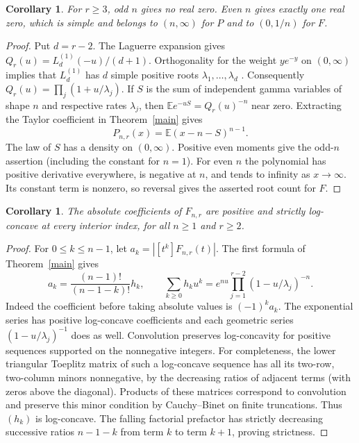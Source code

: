 \documentclass[11pt]{article}
\newtheorem{corollary}[theorem]{Corollary}
\begin{document}
\begin{corollary}
For $r\ge3$, odd $n$ gives no real zero. Even $n$ gives exactly one real zero,
which is simple and belongs to $(n,\infty)$ for $P$ and to $(0,1/n)$ for $F$.
\end{corollary}
\begin{proof}
Put $d=r-2$. The Laguerre expansion gives $Q_r(u)=L_d^{(1)}(-u)/(d+1)$.
Orthogonality for the weight $y e^{-y}$ on $(0,\infty)$ implies that
$L_d^{(1)}$ has $d$ simple positive roots $\lambda_1,\ldots,\lambda_d$
\cite{dlmf}. Consequently $Q_r(u)=\prod_j(1+u/\lambda_j)$. If $S$ is the
sum of independent gamma variables of shape $n$ and respective rates $\lambda_j$,
then $\mathbb E e^{-uS}=Q_r(u)^{-n}$ near zero. Extracting the Taylor coefficient
in Theorem~\ref{main} gives
\[
 P_{n,r}(x)=\mathbb E (x-n-S)^{n-1}.
\]
The law of $S$ has a density on $(0,\infty)$. Positive even moments give the
odd-$n$ assertion (including the constant for $n=1$). For even $n$ the polynomial
has positive derivative everywhere, is negative at $n$, and tends to infinity
as $x\to\infty$. Its constant term is nonzero, so reversal gives the asserted
root count for $F$.
\end{proof}

\begin{corollary}
The absolute coefficients of $F_{n,r}$ are positive and strictly log-concave
at every interior index, for all $n\ge1$ and $r\ge2$.
\end{corollary}
\begin{proof}
For $0\le k\le n-1$, let $a_k=|[t^k]F_{n,r}(t)|$. The first formula of
Theorem~\ref{main} gives
\[
 a_k=\frac{(n-1)!}{(n-1-k)!}h_k,\qquad
 \sum_{k\ge0} h_k u^k=e^{nu}\prod_{j=1}^{r-2}(1-u/\lambda_j)^{-n}.
\]
Indeed the coefficient before taking absolute values is $(-1)^ka_k$.
The exponential series has positive log-concave coefficients and each geometric
series $(1-u/\lambda_j)^{-1}$ does as well. Convolution preserves log-concavity for
positive sequences supported on the nonnegative integers. For completeness, the
lower triangular Toeplitz matrix of such a log-concave sequence has all its
two-row, two-column minors nonnegative, by the decreasing ratios of adjacent terms
(with zeros above the diagonal). Products of these matrices correspond to convolution
and preserve this minor condition by Cauchy--Binet on finite truncations.
Thus $(h_k)$ is log-concave. The falling factorial prefactor has strictly decreasing
successive ratios $n-1-k$ from term $k$ to term $k+1$, proving strictness.
\end{proof}
\end{document}
